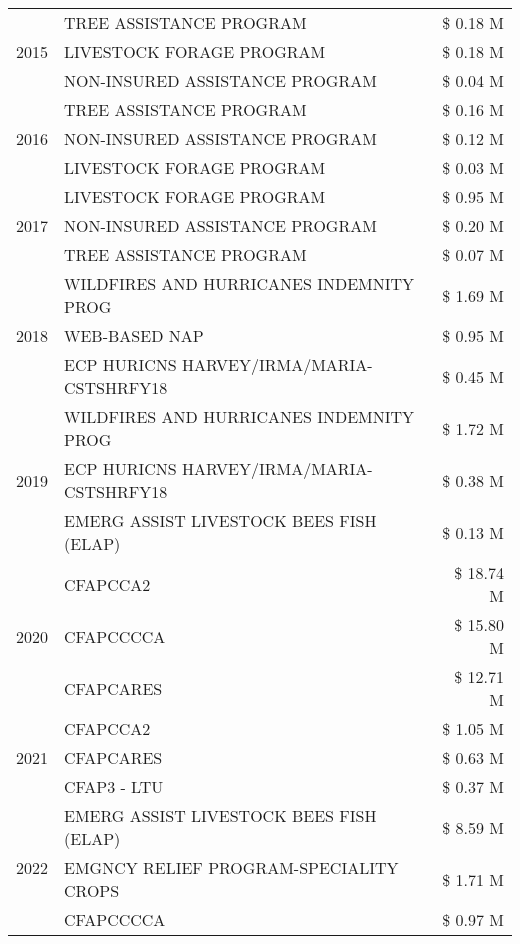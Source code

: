\begin{tabular}{llr}
\cline{1-3}
\multirow[t]{3}{*}{2015} & TREE ASSISTANCE PROGRAM & \$ 0.18 M \\
 & LIVESTOCK FORAGE PROGRAM & \$ 0.18 M \\
 & NON-INSURED ASSISTANCE PROGRAM & \$ 0.04 M \\
\cline{1-3}
\multirow[t]{3}{*}{2016} & TREE ASSISTANCE PROGRAM & \$ 0.16 M \\
 & NON-INSURED ASSISTANCE PROGRAM & \$ 0.12 M \\
 & LIVESTOCK FORAGE PROGRAM & \$ 0.03 M \\
\cline{1-3}
\multirow[t]{3}{*}{2017} & LIVESTOCK FORAGE PROGRAM & \$ 0.95 M \\
 & NON-INSURED ASSISTANCE PROGRAM & \$ 0.20 M \\
 & TREE ASSISTANCE PROGRAM & \$ 0.07 M \\
\cline{1-3}
\multirow[t]{3}{*}{2018} & WILDFIRES AND HURRICANES INDEMNITY PROG & \$ 1.69 M \\
 & WEB-BASED NAP & \$ 0.95 M \\
 & ECP HURICNS HARVEY/IRMA/MARIA-CSTSHRFY18 & \$ 0.45 M \\
\cline{1-3}
\multirow[t]{3}{*}{2019} & WILDFIRES AND HURRICANES INDEMNITY PROG & \$ 1.72 M \\
 & ECP HURICNS HARVEY/IRMA/MARIA-CSTSHRFY18 & \$ 0.38 M \\
 & EMERG ASSIST LIVESTOCK BEES FISH (ELAP) & \$ 0.13 M \\
\cline{1-3}
\multirow[t]{3}{*}{2020} & CFAPCCA2 & \$ 18.74 M \\
 & CFAPCCCCA & \$ 15.80 M \\
 & CFAPCARES & \$ 12.71 M \\
\cline{1-3}
\multirow[t]{3}{*}{2021} & CFAPCCA2 & \$ 1.05 M \\
 & CFAPCARES & \$ 0.63 M \\
 & CFAP3 - LTU & \$ 0.37 M \\
\cline{1-3}
\multirow[t]{3}{*}{2022} & EMERG ASSIST LIVESTOCK BEES FISH (ELAP) & \$ 8.59 M \\
 & EMGNCY RELIEF PROGRAM-SPECIALITY CROPS & \$ 1.71 M \\
 & CFAPCCCCA & \$ 0.97 M \\
\cline{1-3}
\bottomrule
\end{tabular}
